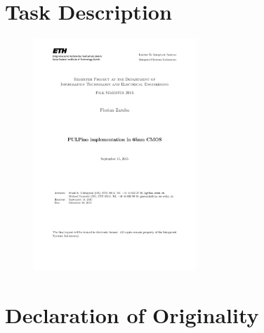 
\chapter{Task Description}
\begin{figure}[h!]
  \centering \includegraphics[width=0.55\textwidth]{task/TaskDescription.pdf}
 \end{figure}



\chapter{Declaration of Originality}\label{chap:originality}


